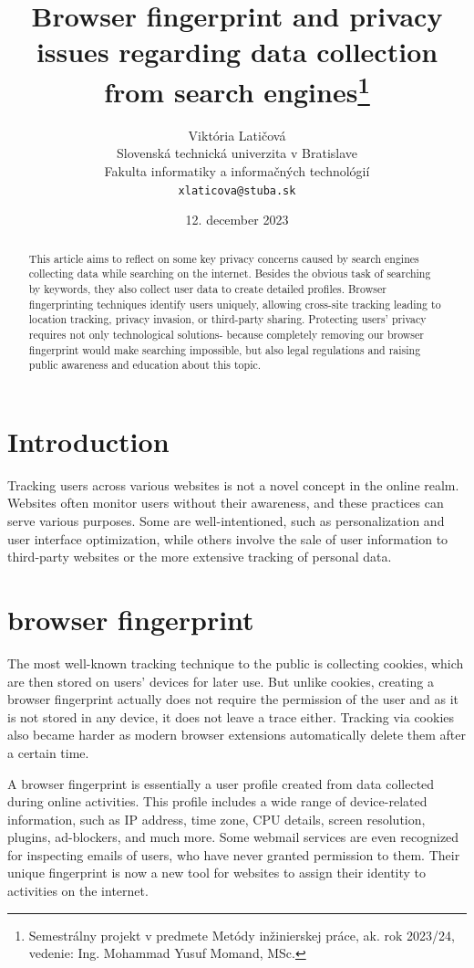 \documentclass[10pt,a4paper,column]{article}
\title{Browser fingerprint and privacy issues regarding data collection from search engines\thanks{Semestrálny projekt v predmete Metódy inžinierskej práce, ak. rok 2023/24, vedenie: Ing. Mohammad Yusuf Momand, MSc.}} %
\author{Viktória Latičová\\[2pt]
	{\small Slovenská technická univerzita v Bratislave}\\
	{\small Fakulta informatiky a informačných technológií}\\
	{\small \texttt{xlaticova@stuba.sk}}
	}
\date{\small 12. december 2023} %
\begin{document}
\maketitle

\begin{abstract}
This article aims to reflect on some key privacy concerns caused by search engines collecting data while searching on the internet. Besides the obvious task of searching by keywords, they also collect user data
to create detailed profiles. Browser fingerprinting techniques identify users uniquely, allowing cross-site tracking leading to location tracking, privacy invasion, or third-party sharing. Protecting users' privacy requires not only technological solutions- because completely removing our browser fingerprint would make searching impossible, but also legal regulations and raising public awareness and education about this topic.
\end{abstract}


\section{Introduction}
Tracking users across various websites is not a novel concept in the online realm. Websites often monitor users without their awareness, and these practices can serve various purposes. Some are well-intentioned, such as personalization and user interface optimization, while others involve the sale of user information to third-party websites or the more extensive tracking of personal data.
\section{browser fingerprint} 

The most well-known tracking technique to the public is collecting cookies, which are then stored on users' devices for later use\cite{Fpstalker}. But unlike cookies, creating a browser fingerprint actually does not require the permission of the user and as it is not stored in any device, it does not leave a trace either. Tracking via cookies also became harder as modern browser extensions automatically delete them after a certain time.

A browser fingerprint is essentially a user profile created from data collected during online activities\cite{FingerprintDefender}. This profile includes a wide range of device-related information, such as IP address, time zone, CPU details, screen resolution, plugins, ad-blockers, and much more. Some webmail services are even recognized for inspecting emails of users, who have never granted permission to them.\cite{webtrackingMID} Their unique fingerprint is now a new tool for websites to assign their identity to activities on the internet.
\end{document}
